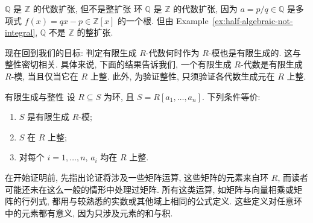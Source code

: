 \begin{Example}{$\mathbb{Q}$ 是 $\mathbb{Z}$ 的代数扩张, 但不是整扩张}\leavevmode\label{ex:rationals-algebraic-not-integral}
  环 $\mathbb{Q}$ 是 $\mathbb{Z}$ 的代数扩张, 因为 $a=p/q\in\mathbb{Q}$ 是多项式 $f(x)=qx-p\in\mathbb{Z}[x]$ 的一个根. 但由 Example~\ref{ex:half-algebraic-not-integral}, $\mathbb{Q}$ 不是 $\mathbb{Z}$ 的整扩张.
\end{Example}

现在回到我们的目标: 判定有限生成 $R$-代数何时作为 $R$-模也是有限生成的. 这与整性密切相关. 具体来说, 下面的结果告诉我们, 一个有限生成 $R$-代数是有限生成 $R$-模, 当且仅当它在 $R$ 上整. 此外, 为验证整性, 只须验证各代数生成元在 $R$ 上整.

\begin{Theorem}{有限生成与整性}\leavevmode\label{thm:finite-generation-integrality}
  设 $R\subseteq S$ 为环, 且 $S=R[a_{1},\ldots,a_{n}]$. 下列条件等价:
  \begin{enumerate}[label=(\roman*)]
    \item $S$ 是有限生成 $R$-模;
    \item $S$ 在 $R$ 上整;
    \item 对每个 $i=1,\ldots,n$, $a_{i}$ 均在 $R$ 上整.
  \end{enumerate}
\end{Theorem}

在开始证明前, 先指出论证将涉及一些矩阵运算, 这些矩阵的元素来自环 $R$, 而读者可能还未在这么一般的情形中处理过矩阵. 所有这类运算, 如矩阵与向量相乘或矩阵的行列式, 都用与较熟悉的实数或其他域上相同的公式定义. 这些定义对任意环中的元素都有意义, 因为只涉及元素的和与积.


